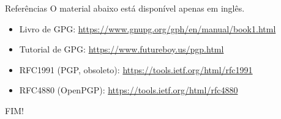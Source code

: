 \documentclass[utf8]{beamer}
\begin{document}
\begin{frame}{Referências}
  O material abaixo está disponível apenas em inglês.
  \begin{itemize}
    \item Livro de GPG:
          \url{https://www.gnupg.org/gph/en/manual/book1.html}
    \item Tutorial de GPG:
          \url{https://www.futureboy.us/pgp.html}
    \item RFC1991 (PGP, obsoleto):
          \url{https://tools.ietf.org/html/rfc1991}
    \item RFC4880 (OpenPGP):
          \url{https://tools.ietf.org/html/rfc4880}
  \end{itemize}
\end{frame}


\begin{frame}
  \begin{center}\fontsize{5cm}{2.5cm}\selectfont
    FIM!
  \end{center}
\end{frame}
\end{document}
